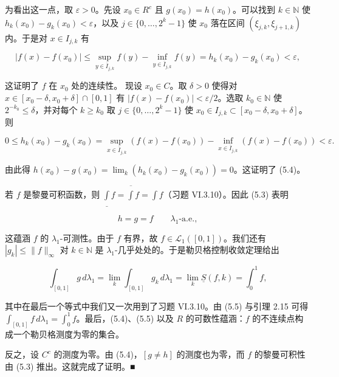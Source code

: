 \begin{theorem}
\begin{subitems}
为看出这一点，取 $ \varepsilon > 0 $。先设 $ x_{0} \in R^{c} $ 且 $ g(x_{0}) = h(x_{0}) $。可以找到 $ k \in \mathbb{N} $ 使 $ h_{k}(x_{0}) - g_{k}(x_{0}) < \varepsilon $，以及 $ j \in \{0,\ldots,2^{k}-1\} $ 使 $ x_{0} $ 落在区间 $ (\xi_{j,k},\xi_{j+1,k}) $ 内。于是对 $ x \in I_{j,k} $ 有

\[
|f(x) - f(x_{0})| \le \sup_{y \in \overline{I}_{j,k}} f(y) - \inf_{y \in \overline{I}_{j,k}} f(y) = h_{k}(x_{0}) - g_{k}(x_{0}) < \varepsilon ,
\]

这证明了 $ f $ 在 $ x_{0} $ 处的连续性。
现设 $ x_{0} \in C $。取 $ \delta > 0 $ 使得对 $ x \in [x_{0}-\delta,x_{0}+\delta] \cap [0,1] $ 有 $ |f(x) - f(x_{0})| < \varepsilon/2 $。选取 $ k_{0} \in \mathbb{N} $ 使 $ 2^{-k_{0}} \le \delta $，并对每个 $ k \ge k_{0} $ 取 $ j \in \{0,\ldots,2^{k}-1\} $ 使 $ x_{0} \in I_{j,k} \subset [x_{0}-\delta,x_{0}+\delta] $。则

\[
0 \le h_{k}(x_{0}) - g_{k}(x_{0}) = \sup_{x \in \overline{I}_{j,k}} (f(x) - f(x_{0})) - \inf_{x \in \overline{I}_{j,k}} (f(x) - f(x_{0})) < \varepsilon .
\]

由此得 $ h(x_{0}) - g(x_{0}) = \lim_{k} (h_{k}(x_{0}) - g_{k}(x_{0})) = 0 $。这证明了 (5.4)。

\item

若 $ f $ 是黎曼可积函数，则 $ \underline{\int} f = \overline{\int} f = \int f $（习题 VI.3.10）。因此 (5.3) 表明

\begin{equation}
h = g = f \qquad \lambda_1\text{-a.e.} ,\tag{5.5}
\end{equation}

这蕴涵 $ f $ 的 $ \lambda_1 $-可测性。由于 $ f $ 有界，故 $ f \in \mathcal{L}_1([0,1]) $。我们还有 $ |g_k| \le \|f\|_\infty $ 对 $ k \in \mathbb{N} $ 是 $ \lambda_1 $-几乎处处的。于是勒贝格控制收敛定理给出

\[
\int_{[0,1]} g \, d\lambda_1 = \lim_{k} \int_{[0,1]} g_k \, d\lambda_1 = \lim_{k} \underline{S}(f,k) = \int_0^1 f ,
\]

其中在最后一个等式中我们又一次用到了习题 VI.3.10。由 (5.5) 与引理 2.15 可得 $ \int_{[0,1]} f \, d\lambda_1 = \int_0^1 f $。最后，(5.4)、(5.5) 以及 $ R $ 的可数性蕴涵：$ f $ 的不连续点构成一个勒贝格测度为零的集合。

\item

反之，设 $ C^c $ 的测度为零。由 (5.4)，$ [g \ne h] $ 的测度也为零，而 $ f $ 的黎曼可积性由 (5.3) 推出。这就完成了证明。\nobreak\hspace{0.35em}■

\end{subitems}

\end{theorem}

